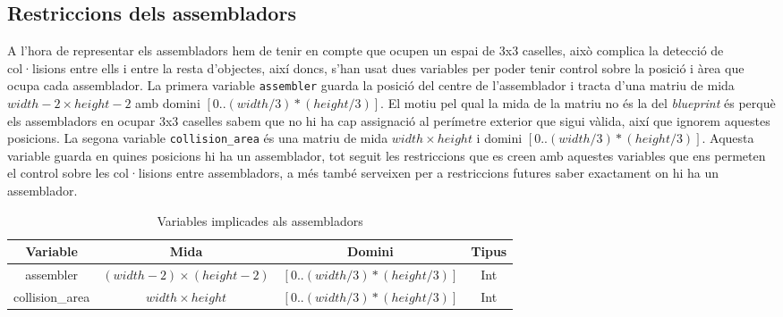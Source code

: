 \subsection{Restriccions dels assembladors}
A l'hora de representar els assembladors hem de tenir en compte que ocupen un espai de 3x3 caselles, això complica la detecció de col·lisions entre ells i entre la resta d'objectes, així doncs, s'han usat dues variables per poder tenir control sobre la posició i àrea que ocupa cada assemblador. La primera variable \lstinline{assembler} guarda la posició del centre de l'assemblador i tracta d'una matriu de mida $width-2 \times height-2$ amb domini $[0..(width/3)*(height/3)]$. El motiu pel qual la mida de la matriu no és la del \textit{blueprint} és perquè els assembladors en ocupar 3x3 caselles sabem que no hi ha cap assignació al perímetre exterior que sigui vàlida, així que ignorem aquestes posicions. La segona variable \lstinline{collision_area} és una matriu de mida $width \times height$ i domini $[0..(width/3)*(height/3)]$. Aquesta variable guarda en quines posicions hi ha un assemblador, tot seguit les restriccions que es creen amb aquestes variables que ens permeten el control sobre les col·lisions entre assembladors, a més també serveixen per a restriccions futures saber exactament on hi ha un assemblador.

\begin{table}[h]
    \centering
    \small
    \begin{tabular}{|c|c|c|c|}
    \hline
    \textbf{Variable} & \textbf{Mida} & \textbf{Domini} & \textbf{Tipus}\\
    \hline
    assembler & $(width-2) \times (height-2)$ & $[0..(width/3)*(height/3)]$ & Int\\
    \hline
    collision\_area & $width \times height$ & $[0..(width/3)*(height/3)]$ & Int\\
    \hline
    \end{tabular}
    \caption{Variables implicades als assembladors}
    \label{assembler-variables}
\end{table}

